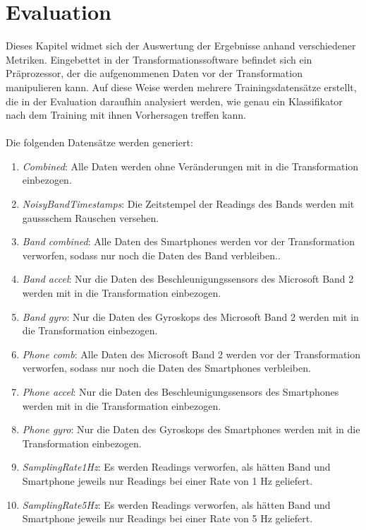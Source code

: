 \chapter{Evaluation}
\label{chap:evaluation}

Dieses Kapitel widmet sich der Auswertung der Ergebnisse anhand verschiedener Metriken. Eingebettet in der Transformationssoftware befindet sich ein Präprozessor, der die aufgenommenen Daten vor der Transformation manipulieren kann. Auf diese Weise werden mehrere Trainingsdatensätze erstellt, die in der Evaluation daraufhin analysiert werden, wie genau ein Klassifikator nach dem Training mit ihnen Vorhersagen treffen kann.
\\\\
Die folgenden Datensätze werden generiert:

\begin{enumerate}
\item \textit{Combined}: Alle Daten werden ohne Veränderungen mit in die Transformation einbezogen.
\item \textit{NoisyBandTimestamps}: Die Zeitstempel der Readings des Bands werden mit gaussschem Rauschen versehen.
\item \textit{Band combined}: Alle Daten des Smartphones werden vor der Transformation verworfen, sodass nur noch die Daten des Band verbleiben..
\item \textit{Band accel}: Nur die Daten des Beschleunigungssensors des Microsoft Band 2 werden mit in die Transformation einbezogen.
\item \textit{Band gyro}: Nur die Daten des Gyroskops des Microsoft Band 2 werden mit in die Transformation einbezogen.
\item \textit{Phone comb}: Alle Daten des Microsoft Band 2 werden vor der Transformation verworfen, sodass nur noch die Daten des Smartphones verbleiben.
\item \textit{Phone accel}: Nur die Daten des Beschleunigungssensors des Smartphones werden mit in die Transformation einbezogen.
\item \textit{Phone gyro}: Nur die Daten des Gyroskops des Smartphones werden mit in die Transformation einbezogen.
\item \textit{SamplingRate1Hz}: Es werden Readings verworfen, als hätten Band und Smartphone jeweils nur Readings bei einer Rate von 1 Hz geliefert.
\item \textit{SamplingRate5Hz}: Es werden Readings verworfen, als hätten Band und Smartphone jeweils nur Readings bei einer Rate von 5 Hz geliefert.
\end{enumerate}

